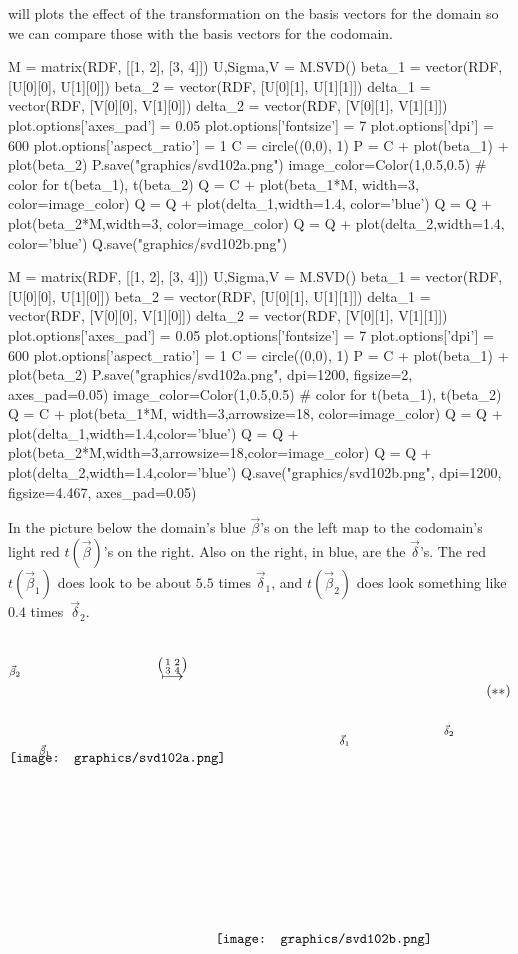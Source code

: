 \Sage{} will plots the effect of the transformation
on the basis vectors for the domain so we can compare those with the
basis vectors for the codomain.
\begin{sageoutput}[d,0,2;d,6,10]
M = matrix(RDF, [[1, 2], [3, 4]])
U,Sigma,V = M.SVD()
beta_1 = vector(RDF, [U[0][0], U[1][0]])
beta_2 = vector(RDF, [U[0][1], U[1][1]])
delta_1 = vector(RDF, [V[0][0], V[1][0]])
delta_2 = vector(RDF, [V[0][1], V[1][1]])
plot.options['axes_pad'] = 0.05
plot.options['fontsize'] = 7
plot.options['dpi'] = 600
plot.options['aspect_ratio'] = 1
C = circle((0,0), 1)
P = C + plot(beta_1) + plot(beta_2)
P.save("graphics/svd102a.png")
image_color=Color(1,0.5,0.5)   # color for t(beta_1), t(beta_2)
Q = C + plot(beta_1*M, width=3, color=image_color) 
Q = Q + plot(delta_1,width=1.4, color='blue') 
Q = Q + plot(beta_2*M,width=3, color=image_color) 
Q = Q + plot(delta_2,width=1.4, color='blue')
Q.save("graphics/svd102b.png")
\end{sageoutput}
\begin{sagesilent}
M = matrix(RDF, [[1, 2], [3, 4]])
U,Sigma,V = M.SVD()
beta_1 = vector(RDF, [U[0][0], U[1][0]])
beta_2 = vector(RDF, [U[0][1], U[1][1]])
delta_1 = vector(RDF, [V[0][0], V[1][0]])
delta_2 = vector(RDF, [V[0][1], V[1][1]])
plot.options['axes_pad'] = 0.05
plot.options['fontsize'] = 7
plot.options['dpi'] = 600
plot.options['aspect_ratio'] = 1
C = circle((0,0), 1)
P = C + plot(beta_1) + plot(beta_2)
P.save("graphics/svd102a.png", dpi=1200, figsize=2, axes_pad=0.05)
image_color=Color(1,0.5,0.5)   # color for t(beta_1), t(beta_2)
Q = C + plot(beta_1*M, width=3,arrowsize=18, color=image_color) 
Q = Q + plot(delta_1,width=1.4,color='blue') 
Q = Q + plot(beta_2*M,width=3,arrowsize=18,color=image_color) 
Q = Q + plot(delta_2,width=1.4,color='blue')
Q.save("graphics/svd102b.png", dpi=1200, figsize=4.467, axes_pad=0.05)
\end{sagesilent}
In the picture below the domain's 
blue $\vec{\beta}$'s on the left map to the codomain's light red 
$t(\vec{\beta})$'s on the right.
Also on the right, in blue, are the $\vec{\delta}$'s.
The red $t(\vec{\beta}_1)$ does look to be about $5.5$ times $\vec{\delta}_1$,
and $t(\vec{\beta}_2)$ does look something like $0.4$ times~$\vec{\delta}_2$. 
\begin{equation*}
  \setlength{\unitlength}{1in}
  \begin{picture}(1.35,1.35)
    \put(0,1.825){\texttt{[image: graphics/svd102a.png]}}
    \put(.3,1.9){\scriptsize $\vec{\beta}_1$}
    \put(0,2.7){\scriptsize $\vec{\beta}_2$}
  \end{picture}
  \quad
  \raisebox{2.65in}{$\mapsunder{\big (\begin{smallmatrix} 1 &2 \\ 3 &4 \end{smallmatrix}\big )}$}
  \qquad
  \begin{picture}(2.45,3.15)
    \put(0,0){\texttt{[image: graphics/svd102b.png]}}
    \put(1.25,2){\scriptsize $\vec{\delta}_1$}
    \put(2.3,2.1){\scriptsize $\vec{\delta}_2$}
  \end{picture}
  \tag*{\raisebox{2.5in}{($**$)}}
\end{equation*}
